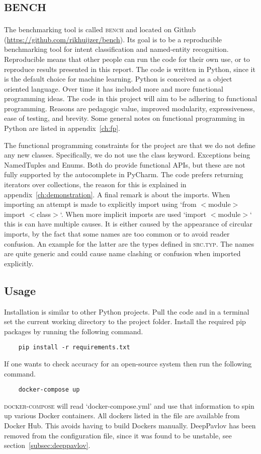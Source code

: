 \chapter{\textsc{bench}}
\label{ch:bench}

The benchmarking tool is called \textsc{bench} and located on Github (\url{https://github.com/rikhuijzer/bench}).
Its goal is to be a reproducible benchmarking tool for intent classification and named-entity recognition.
Reproducible means that other people can run the code for their own use, or to reproduce results presented in this report.
The code is written in Python, since it is the default choice for machine learning.
Python is conceived as a object oriented language.
Over time it has included more and more functional programming ideas.
The code in this project will aim to be adhering to functional programming.
Reasons are pedagogic value, improved modularity, expressiveness, ease of testing, and brevity.
Some general notes on functional programming in Python are listed in appendix~\ref{ch:fp}.

The functional programming constraints for the project are that we do not define any new classes.
Specifically, we do not use the class keyword.
Exceptions being NamedTuples and Enums.
Both do provide functional APIs, but these are not fully supported by the autocomplete in PyCharm.
The code prefers returning iterators over collections, the reason for this is explained in appendix~\ref{ch:demonstration}.
A final remark is about the imports.
When importing an attempt is made to explicitly import using `from $<$module$>$ import $<$class$>$`.
When more implicit imports are used `import $<$module$>$` this is can have multiple causes.
It is either caused by the appearance of circular imports, by the fact that some names are too common or to avoid reader confusion.
An example for the latter are the types defined in \textsc{src.typ}.
The names are quite generic and could cause name clashing or confusion when imported explicitly.

\section{Usage}
\label{sec:usage}
Installation is similar to other Python projects.
Pull the code and in a terminal set the current working directory to the project folder.
Install the required pip packages by running the following command.
\begin{verbatim}
    pip install -r requirements.txt
\end{verbatim}
If one wants to check accuracy for an open-source system then run the following command.
\begin{verbatim}
    docker-compose up
\end{verbatim}
\textsc{docker-compose} will read `docker-compose.yml' and use that information to spin up various Docker containers.
All dockers listed in the file are available from Docker Hub.
This avoids having to build Dockers manually.
DeepPavlov has been removed from the configuration file, since it was found to be unstable, see section~\ref{subsec:deeppavlov}.

